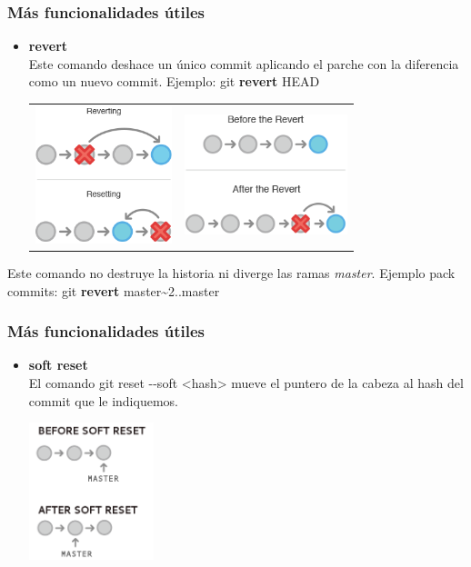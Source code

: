 \frame
{
\frametitle{Más funcionalidades útiles}
\begin{itemize}
 \item \textbf{revert}\\ \indent
  Este comando deshace un único commit aplicando el parche con la diferencia como un nuevo commit. Ejemplo: git \textbf{revert} HEAD
 \begin{tabular}{p{4cm}|p{4cm}}\\
    \includegraphics[height=4cm]{imgs/revert-vs-reset.png}&
    \includegraphics[height=3.5cm]{imgs/revert-sample.png}\\
 \end{tabular}
\end{itemize}

 Este comando no destruye la historia ni diverge las ramas \textit{master}. Ejemplo pack commits: git \textbf{revert} master\textasciitilde2..master
}

\frame
{
\frametitle{Más funcionalidades útiles}
\begin{itemize}
 \item \textbf{soft reset}\\ \indent
 El comando git reset -{}-soft <hash> mueve el puntero de la cabeza al hash del commit que le indiquemos.\\
 \begin{center}
    \includegraphics[height=4cm]{imgs/soft-reset.png}
 \end{center}
\end{itemize}
}

